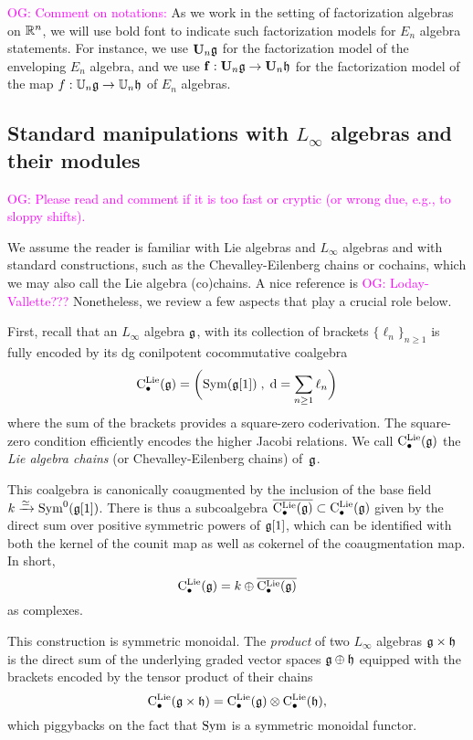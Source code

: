 \documentclass[11pt]{amsart}
\numberwithin{equation}{section}
\def\owen{\textcolor{magenta}{OG: }\textcolor{magenta}}
\begin{document}
\owen{Comment on notations:}
As we work in the setting of factorization algebras on $\mathbb R^n$, 
we will use bold font to indicate such factorization models for $E_n$ algebra statements.
For instance, we use $\mathbf U_n \mathfrak g$ for the factorization model of the enveloping $E_n$ algebra,
and we use ${\bf f}: \mathbf U_n \mathfrak g \to \mathbf U_n \mathfrak h$ for the factorization model of the map $f: \mathbb U_n \mathfrak g \to \mathbb U_n \mathfrak h$ of $E_n$ algebras.

\subsection{Standard manipulations with $L_\infty$ algebras and their modules}
\label{sec: review of linfty}

\owen{Please read and comment if it is too fast or cryptic (or wrong due, e.g., to sloppy shifts).}

We assume the reader is familiar with Lie algebras and $L_\infty$ algebras and with standard constructions,
such as the Chevalley-Eilenberg chains or cochains, which we may also call the Lie algebra (co)chains.
A nice reference is \owen{Loday-Vallette???}
Nonetheless, we review a few aspects that play a crucial role below.

First, recall that an $L_\infty$ algebra $\mathfrak g$, with its collection of brackets $\{\ell_n\}_{n \geq 1}$ is fully encoded by its dg conilpotent cocommutative coalgebra
\[
{\rm C}^{\rm Lie}_\bullet(\mathfrak g) = \bigg({\rm Sym}(\mathfrak g[1]) \; , \; {\rm d} = \sum_{n \geq 1} \ell_n\bigg)
\]
where the sum of the brackets provides a square-zero coderivation.
The square-zero condition efficiently encodes the higher Jacobi relations.
We call ${\rm C}^{\rm Lie}_\bullet(\mathfrak g)$ the {\em Lie algebra chains} (or Chevalley-Eilenberg chains) of~$\mathfrak g$.

This coalgebra is canonically coaugmented by the inclusion of the base field $k \xrightarrow{\simeq} {\rm Sym}^0(\mathfrak g[1])$.
There is thus a subcoalgebra $\overline{{\rm C}^{\rm Lie}_\bullet(\mathfrak g)} \subset {\rm C}^{\rm Lie}_\bullet(\mathfrak g)$ given by the direct sum over positive symmetric powers of $\mathfrak g[1]$,
which can be identified with both the kernel of the counit map as well as cokernel of the coaugmentation map.
In short,
\[
{\rm C}^{\rm Lie}_\bullet(\mathfrak g) = k \oplus \overline{{\rm C}^{\rm Lie}_\bullet(\mathfrak g)}
\]
as complexes.

This construction is symmetric monoidal.
The {\em product} of two $L_\infty$ algebras $\mathfrak g \times \mathfrak h$ is the direct sum of the underlying graded vector spaces $\mathfrak g \oplus \mathfrak h$ equipped with the brackets encoded by the tensor product of their chains
\[
{\rm C}^{\rm Lie}_\bullet(\mathfrak g \times \mathfrak h) = {\rm C}^{\rm Lie}_\bullet(\mathfrak g) \otimes {\rm C}^{\rm Lie}_\bullet(\mathfrak h),
\]
which piggybacks on the fact that ${\rm Sym}$ is a symmetric monoidal functor.
\end{document}
